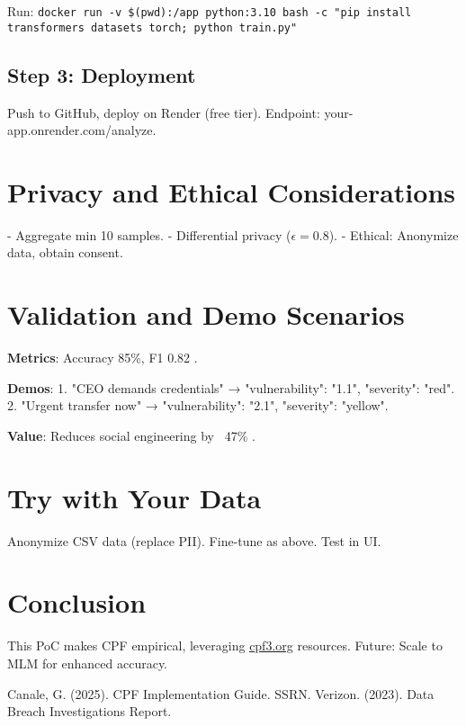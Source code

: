 \documentclass[11pt,a4paper]{article}
\begin{document}
Run: \texttt{docker run -v \$(pwd):/app python:3.10 bash -c "pip install transformers datasets torch; python train.py"}

\subsection{Step 3: Deployment}

Push to GitHub, deploy on Render (free tier). Endpoint: your-app.onrender.com/analyze.

\section{Privacy and Ethical Considerations}

- Aggregate min 10 samples.
- Differential privacy ($\epsilon=0.8$).
- Ethical: Anonymize data, obtain consent.

\section{Validation and Demo Scenarios}

\textbf{Metrics}: Accuracy 85\%, F1 0.82 \cite{cpf2025}.

\textbf{Demos}:
1. "CEO demands credentials" → {"vulnerability": "1.1", "severity": "red"}.
2. "Urgent transfer now" → {"vulnerability": "2.1", "severity": "yellow"}.

\textbf{Value}: Reduces social engineering by ~47\% \cite{cpf2025}.

\section{Try with Your Data}

Anonymize CSV data (replace PII). Fine-tune as above. Test in UI.

\section{Conclusion}

This PoC makes CPF empirical, leveraging \href{https://cpf3.org}{cpf3.org} resources. Future: Scale to MLM for enhanced accuracy.

\begin{thebibliography}{99}
 Canale, G. (2025). CPF Implementation Guide. SSRN.
 Verizon. (2023). Data Breach Investigations Report.
\end{thebibliography}
\end{document}
